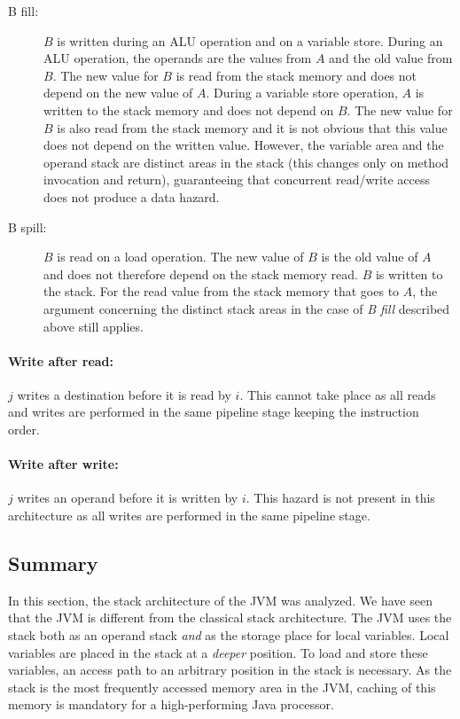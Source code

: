 %
\begin{description}
\item[B fill:] $B$ is written during an ALU operation and on a
    variable store. During an ALU operation, the operands are the
    values from $A$ and the old value from $B$. The new value for
    $B$ is read from the stack memory and does not depend on the
    new value of $A$. During a variable store operation, $A$ is
    written to the stack memory and does not depend on $B$. The
    new value for $B$ is also read from the stack memory and it
    is not obvious that this value does not depend on the written
    value. However, the variable area and the operand stack are
    distinct areas in the stack (this changes only on method
    invocation and return), guaranteeing that concurrent
    read/write access does not produce a data hazard.

\item[B spill:] $B$ is read on a load operation. The new value of
    $B$ is the old value of $A$ and does not therefore depend on
    the stack memory read. $B$ is written to the stack. For the
    read value from the stack memory that goes to $A$, the
    argument concerning the distinct stack areas in the case of
    \textit{B fill} described above still applies.
\end{description}
%
\paragraph{Write after read:} $j$ writes a destination before it is read by
$i$. This cannot take place as all reads and writes are performed in
the same pipeline stage keeping the instruction order.

\paragraph{Write after write:} $j$ writes an operand before it is written by
$i$. This hazard is not present in this architecture as all writes
are performed in the same pipeline stage.


\subsection{Summary}

In this section, the stack architecture of the JVM was analyzed. We
have seen that the JVM is different from the classical stack
architecture. The JVM uses the stack both as an operand stack
\textit{and} as the storage place for local variables. Local
variables are placed in the stack at a \textit{deeper} position. To
load and store these variables, an access path to an arbitrary
position in the stack is necessary. As the stack is the most
frequently accessed memory area in the JVM, caching of this memory
is mandatory for a high-performing Java processor.

